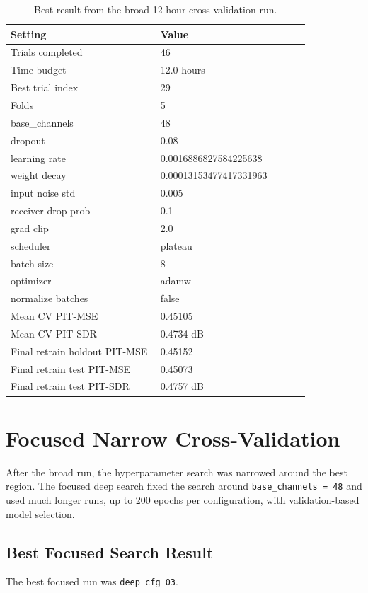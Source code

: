 \documentclass[11pt]{article}
\begin{document}
\begin{table}[H]
\centering
\caption{Best result from the broad 12-hour cross-validation run.}
\begin{tabular}{|p{0.42\linewidth}|p{0.42\linewidth}|}
\hline
Setting & Value \\
\hline
Trials completed & 46 \\
Time budget & 12.0 hours \\
Best trial index & 29 \\
Folds & 5 \\
base\_channels & 48 \\
dropout & 0.08 \\
learning rate & 0.0016886827584225638 \\
weight decay & 0.00013153477417331963 \\
input noise std & 0.005 \\
receiver drop prob & 0.1 \\
grad clip & 2.0 \\
scheduler & plateau \\
batch size & 8 \\
optimizer & adamw \\
normalize batches & false \\
Mean CV PIT-MSE & 0.45105 \\
Mean CV PIT-SDR & 0.4734 dB \\
Final retrain holdout PIT-MSE & 0.45152 \\
Final retrain test PIT-MSE & 0.45073 \\
Final retrain test PIT-SDR & 0.4757 dB \\
\hline
\end{tabular}
\end{table}

\section{Focused Narrow Cross-Validation}
After the broad run, the hyperparameter search was narrowed around the best region. The focused deep search fixed the search around \texttt{base\_channels = 48} and used much longer runs, up to 200 epochs per configuration, with validation-based model selection.

\subsection{Best Focused Search Result}
The best focused run was \texttt{deep\_cfg\_03}.
\end{document}
